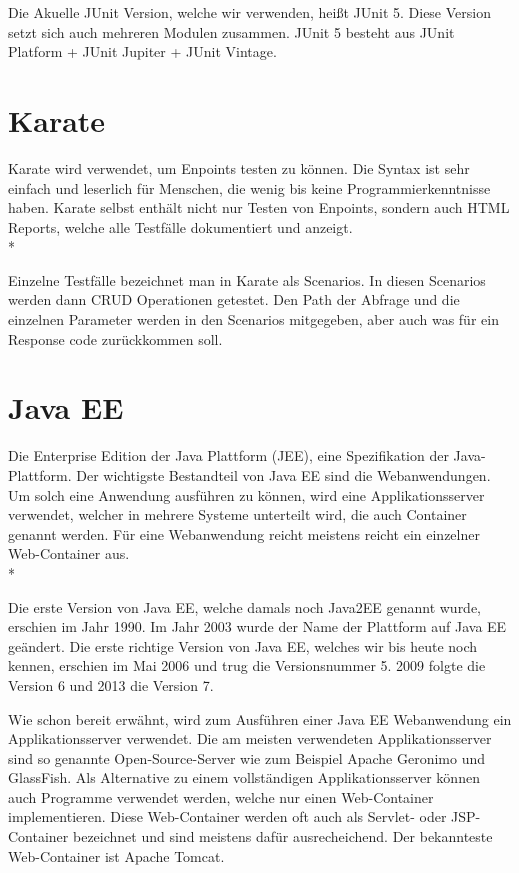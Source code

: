 Die Akuelle JUnit Version, welche wir verwenden, heißt JUnit 5. Diese Version setzt sich auch mehreren Modulen zusammen. JUnit 5 besteht aus JUnit Platform + JUnit Jupiter + JUnit Vintage.

\section{Karate}
\author{David Ignjatovic} 

Karate wird verwendet, um Enpoints testen zu können. Die Syntax ist sehr einfach und leserlich für Menschen, die wenig bis keine Programmierkenntnisse haben.
Karate selbst enthält nicht nur Testen von Enpoints, sondern auch HTML Reports, welche alle Testfälle dokumentiert und anzeigt. \\*

Einzelne Testfälle bezeichnet man in Karate als Scenarios. In diesen Scenarios werden dann CRUD Operationen getestet. Den Path der Abfrage und die einzelnen 
Parameter werden in den Scenarios mitgegeben, aber auch was für ein Response code zurückkommen soll.


\section{Java EE}
\author{David Ignjatovic} 

Die Enterprise Edition der Java Plattform (JEE), eine Spezifikation der Java-Plattform. 
Der wichtigste Bestandteil von Java EE sind die Webanwendungen. Um solch eine Anwendung ausführen zu können, wird eine Applikationsserver verwendet, welcher 
in mehrere Systeme unterteilt wird, die auch Container genannt werden. Für eine Webanwendung reicht meistens reicht ein einzelner Web-Container aus. \\*

Die erste Version von Java EE, welche damals noch Java2EE genannt wurde, erschien im Jahr 1990. Im Jahr 2003 wurde der Name der Plattform auf Java EE geändert.
Die erste richtige Version von Java EE, welches wir bis heute noch kennen, erschien im Mai 2006 und trug die Versionsnummer 5. 2009 folgte die Version 6 und 2013 die Version 7.

Wie schon bereit erwähnt, wird zum Ausführen einer Java EE Webanwendung ein Applikationsserver verwendet. Die am meisten verwendeten Applikationsserver sind so genannte 
Open-Source-Server wie zum Beispiel Apache Geronimo und GlassFish. 
Als Alternative zu einem vollständigen Applikationsserver können auch Programme verwendet werden, welche nur einen Web-Container implementieren.
Diese Web-Container werden oft auch als Servlet- oder JSP-Container bezeichnet und sind meistens dafür ausrecheichend. Der bekannteste Web-Container ist Apache Tomcat.

